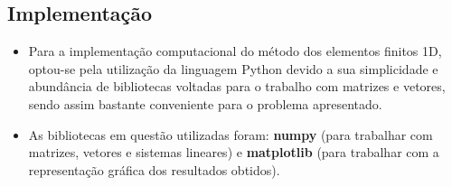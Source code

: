 \documentclass[10pt]{article}
\begin{document}
    \subsection{Implementação}
    \begin{itemize}
    \item Para a implementação computacional do método dos elementos finitos 1D, optou-se pela utilização da linguagem Python devido a sua simplicidade e abundância de bibliotecas voltadas para o trabalho com matrizes e vetores, sendo assim bastante conveniente para o problema apresentado.
    \item As bibliotecas em questão utilizadas foram: \textbf{numpy} (para trabalhar com matrizes, vetores e sistemas lineares) e \textbf{matplotlib} (para trabalhar com a representação gráfica dos resultados obtidos).
    \end{itemize}
    
\end{document}
